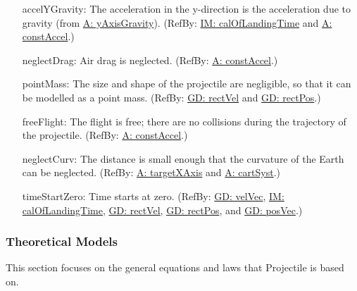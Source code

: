 \documentclass[12pt]{article}
\begin{document}
\begin{itemize}
\item[accelYGravity:\phantomsection\label{accelYGravity}]The acceleration in the y-direction is the acceleration due to gravity (from \hyperref[yAxisGravity]{A: yAxisGravity}). (RefBy: \hyperref[IM:calOfLandingTime]{IM: calOfLandingTime} and \hyperref[constAccel]{A: constAccel}.)
\item[neglectDrag:\phantomsection\label{neglectDrag}]Air drag is neglected. (RefBy: \hyperref[constAccel]{A: constAccel}.)
\item[pointMass:\phantomsection\label{pointMass}]The size and shape of the projectile are negligible, so that it can be modelled as a point mass. (RefBy: \hyperref[GD:rectVel]{GD: rectVel} and \hyperref[GD:rectPos]{GD: rectPos}.)
\item[freeFlight:\phantomsection\label{freeFlight}]The flight is free; there are no collisions during the trajectory of the projectile. (RefBy: \hyperref[constAccel]{A: constAccel}.)
\item[neglectCurv:\phantomsection\label{neglectCurv}]The distance is small enough that the curvature of the Earth can be neglected. (RefBy: \hyperref[targetXAxis]{A: targetXAxis} and \hyperref[cartSyst]{A: cartSyst}.)
\item[timeStartZero:\phantomsection\label{timeStartZero}]Time starts at zero. (RefBy: \hyperref[GD:velVec]{GD: velVec}, \hyperref[IM:calOfLandingTime]{IM: calOfLandingTime}, \hyperref[GD:rectVel]{GD: rectVel}, \hyperref[GD:rectPos]{GD: rectPos}, and \hyperref[GD:posVec]{GD: posVec}.)
\end{itemize}
\subsubsection{Theoretical Models}
\label{Sec:TMs}
This section focuses on the general equations and laws that Projectile is based on.
\par~
\end{document}
